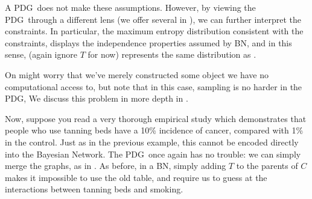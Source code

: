 \documentclass{article}
\newcommand{\MN}{PDG}
\numberwithin{equation}{section}
\begin{document}
\begin{example}
		
		A \MN\ does not make these assumptions. However, by viewing the \MN\ through a different lens (we offer several in ), we can further interpret the constraints. In particular, the maximum entropy distribution consistent with the constraints, displays the independence properties assumed by BN, and in this sense,  (again ignore $T$ for now) represents the same distribution as .
		\begin{vfull}
			On might worry that we've merely constructed some object we have no computational access to, but note that in this case, sampling is no harder in the \MN, We discuss this problem in more depth in .
		\end{vfull}
				
		Now, suppose you read a very thorough empirical study which demonstrates that people who use tanning beds have a 10\% incidence of cancer, compared with 1\% in the control. Just as in the previous example, this cannot be encoded directly into the Bayesian Network. 
		The \MN\, once again has no trouble: we can simply merge the graphs, as in .
%			
		As before, in a BN, simply adding $T$ to the parents of $C$ makes it impossible to use the old table, and require us to guess at the interactions between tanning beds and smoking.
	\end{example}	
\end{document}
